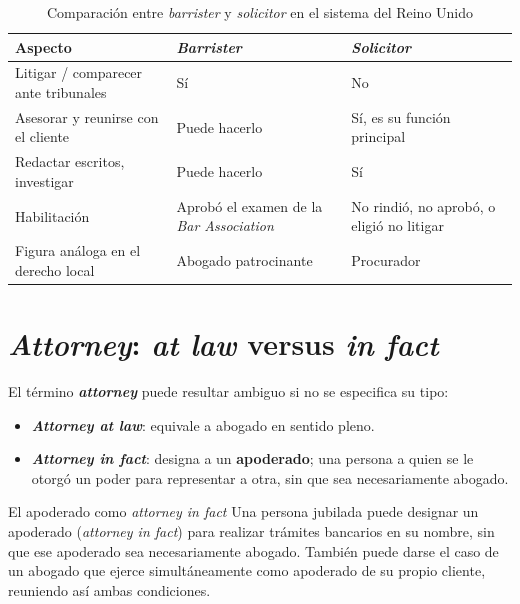 \documentclass[12pt,oneside]{book}
\begin{document}
\begin{table}[H]
\centering
\caption{Comparación entre \textit{barrister} y \textit{solicitor} en el sistema del Reino Unido}
\begin{tabularx}{\textwidth}{
    >{\raggedright\arraybackslash}p{}
    >{\raggedright\arraybackslash}X
    >{\raggedright\arraybackslash}X
}
\toprule
\textbf{Aspecto} & \textbf{\textit{Barrister}} & \textbf{\textit{Solicitor}} \\
\midrule
Litigar / comparecer ante tribunales & Sí & No \\
\addlinespace
Asesorar y reunirse con el cliente & Puede hacerlo & Sí, es su función principal \\
\addlinespace
Redactar escritos, investigar & Puede hacerlo & Sí \\
\addlinespace
Habilitación & Aprobó el examen de la \textit{Bar Association} & No rindió, no aprobó, o eligió no litigar \\
\addlinespace
Figura análoga en el derecho local & Abogado patrocinante & Procurador \\
\bottomrule
\end{tabularx}
\end{table}

\section{\textit{Attorney}: \textit{at law} versus \textit{in fact}}

El término \textbf{\textit{attorney}} puede resultar ambiguo si no se especifica su tipo:

\begin{itemize}
    \item \textbf{\textit{Attorney at law}}: equivale a abogado en sentido pleno.
    \item \textbf{\textit{Attorney in fact}}: designa a un \textbf{apoderado}; una persona a quien se le otorgó un poder para representar a otra, sin que sea necesariamente abogado.
\end{itemize}

\begin{example}{El apoderado como \textit{attorney in fact}}
Una persona jubilada puede designar un apoderado (\textit{attorney in fact}) para realizar trámites bancarios en su nombre, sin que ese apoderado sea necesariamente abogado. También puede darse el caso de un abogado que ejerce simultáneamente como apoderado de su propio cliente, reuniendo así ambas condiciones.
\end{example}
\end{document}
